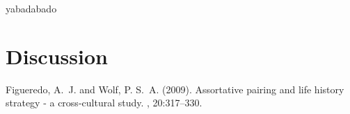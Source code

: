 \documentclass[twoside,twocolumn]{article}
\begin{document}
yabadabado



\section{Discussion}



\begin{thebibliography}{99} %

Figueredo, A.~J. and Wolf, P. S.~A. (2009).
\newblock Assortative pairing and life history strategy - a cross-cultural
  study.
, 20:317--330.
 
\end{thebibliography}

\end{document}
